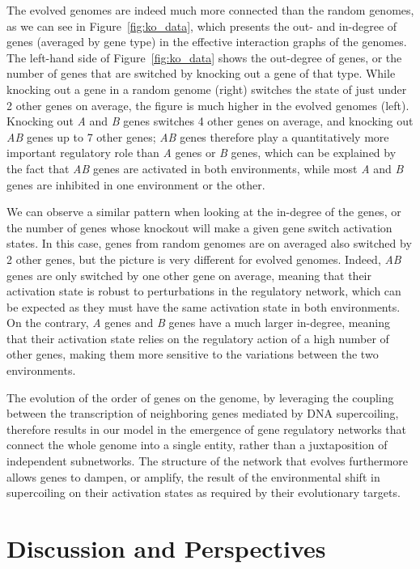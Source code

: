 The evolved genomes are indeed much more connected than the random genomes, as we can see in Figure~\ref{fig:ko_data}, which presents the out- and in-degree of genes (averaged by gene type) in the effective interaction graphs of the genomes.
The left-hand side of Figure~\ref{fig:ko_data} shows the out-degree of genes, or the number of genes that are switched by knocking out a gene of that type.
While knocking out a gene in a random genome (right) switches the state of just under 2 other genes on average, the figure is much higher in the evolved genomes (left).
Knocking out \emph{A} and \emph{B} genes switches 4 other genes on average, and knocking out \emph{AB} genes up to 7 other genes;
\emph{AB} genes therefore play a quantitatively more important regulatory role than \emph{A} genes or \emph{B} genes, which can be explained by the fact that \emph{AB} genes are activated in both environments, while most \emph{A} and \emph{B} genes are inhibited in one environment or the other.

We can observe a similar pattern when looking at the in-degree of the genes, or the number of genes whose knockout will make a given gene switch activation states.
In this case, genes from random genomes are on averaged also switched by 2 other genes, but the picture is very different for evolved genomes.
Indeed, \emph{AB} genes are only switched by one other gene on average, meaning that their activation state is robust to perturbations in the regulatory network, which can be expected as they must have the same activation state in both environments.
On the contrary, \emph{A} genes and \emph{B} genes have a much larger in-degree, meaning that their activation state relies on the regulatory action of a high number of other genes, making them more sensitive to the variations between the two environments.

The evolution of the order of genes on the genome, by leveraging the coupling between the transcription of neighboring genes mediated by DNA supercoiling, therefore results in our model in the emergence of gene regulatory networks that connect the whole genome into a single entity, rather than a juxtaposition of independent subnetworks.
The structure of the network that evolves furthermore allows genes to dampen, or amplify, the result of the environmental shift in supercoiling on their activation states as required by their evolutionary targets.

\section{Discussion and Perspectives}


